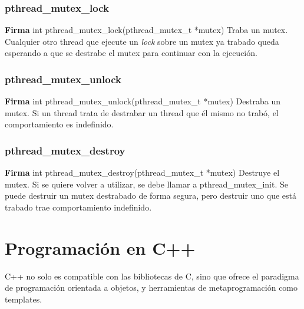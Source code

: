 \documentclass[a4paper, twoside]{article}
\begin{document}

\subsubsection{pthread\_mutex\_lock}
\textbf{Firma} int pthread\_mutex\_lock(pthread\_mutex\_t *mutex)
Traba un mutex. Cualquier otro thread que ejecute un \emph{lock} sobre un mutex ya trabado queda esperando a que se destrabe el mutex para continuar con la ejecución.

\subsubsection{pthread\_mutex\_unlock}
\textbf{Firma} int pthread\_mutex\_unlock(pthread\_mutex\_t *mutex)
Destraba un mutex. Si un thread trata de destrabar un thread que él mismo no trabó, el comportamiento es indefinido.

\subsubsection{pthread\_mutex\_destroy}
\textbf{Firma} int pthread\_mutex\_destroy(pthread\_mutex\_t *mutex)
Destruye el mutex. Si se quiere volver a utilizar, se debe llamar a pthread\_mutex\_init. Se puede destruir un mutex destrabado de forma segura, pero destruir uno que está trabado trae comportamiento indefinido.

\newpage
\section{Programación en C++}
C++ no solo es compatible con las bibliotecas de C, sino que ofrece el paradigma de programación orientada a objetos, y herramientas de metaprogramación como templates.
\end{document}
